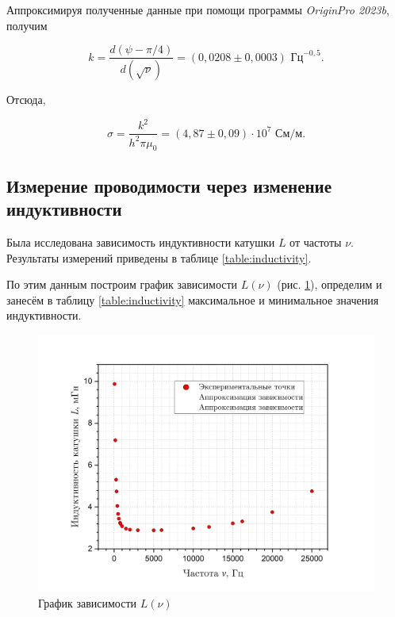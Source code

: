 \documentclass[a4paper, 12pt]{article}
\begin{document}
    Аппроксимируя полученные данные при помощи программы \textit{OriginPro 2023b}, получим 

    \begin{equation*}
        k = \frac{d(\psi - \pi/4)}{d(\sqrt{\nu})} = \left( 0,0208 \pm 0,0003 \right) \text{ Гц}^{-0,5}.
    \end{equation*}

    Отсюда,

    \begin{equation*}
        \boxed{\sigma = \frac{k^2}{h^2 \pi \mu_0} = \left( 4,87 \pm 0,09 \right) \cdot 10^7 \text{ См/м}}.
    \end{equation*}

    \subsection{Измерение проводимости через изменение индуктивности}

    Была исследована зависимость индуктивности катушки $L$ от частоты $\nu$. Результаты измерений приведены в таблице \ref{table:inductivity}. 

    По этим данным построим график зависимости $L (\nu)$ (рис. \ref{graph:L_nu}), определим и занесём в таблицу \ref{table:inductivity} максимальное и минимальное значения индуктивности.


    \begin{figure}[H]
        \centering
        \includegraphics[width = 14 cm]{images/graph_l_nu.png}
        \caption{График зависимости $L (\nu)$}
        \label{graph:L_nu}
    \end{figure}
\end{document}

